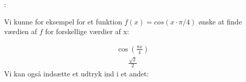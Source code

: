 \documentclass[letterpaper,10pt,english]{jupyterBook}
\begin{document}
:

Vi kunne for eksempel for et funktion \(f(x) = cos(x \cdot \pi / 4)\) ønske at finde værdien af \(f\) for forskellige værdier af x:

\begin{sphinxVerbatim}[commandchars=\\\{\}]
      

 
\end{sphinxVerbatim}
\begin{equation*}
\begin{split}\displaystyle \cos{\left(\frac{\pi x}{4} \right)}\end{split}
\end{equation*}\begin{equation*}
\begin{split}\displaystyle \frac{\sqrt{2}}{2}\end{split}
\end{equation*}
Vi kan også indsætte et udtryk ind i et andet:
\end{document}
